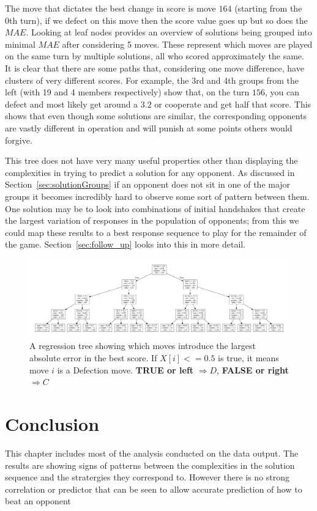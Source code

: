 The move that dictates the best change in score is move $164$ (starting from the 0th turn), if we defect on this move then the score value goes up but so does the $MAE$.
Looking at leaf nodes provides an overview of solutions being grouped into minimal $MAE$ after considering 5 moves.
These represent which moves are played on the same turn by multiple solutions, all who scored approximately the same.
It is clear that there are some paths that, considering one move difference, have clusters of very different scores. 
For example, the 3rd and 4th groups from the left (with 19 and 4 members respectively) show that, on the turn $156$, you can defect and most likely get around a $3.2$ or cooperate and get half that score.
This shows that even though some solutions are similar, the corresponding opponents are vastly different in operation and will punish at some points others would forgive.

This tree does not have very many useful properties other than displaying the complexities in trying to predict a solution for any opponent.
As discussed in Section~\ref{sec:solutionGroups} if an opponent does not sit in one of the major groups it becomes incredibly hard to observe some sort of pattern between them.
One solution may be to look into combinations of initial handshakes that create the largest variation of responses in the population of opponents; from this we could map these results to a best response sequence to play for the remainder of the game.
Section~\ref{sec:follow_up} looks into this in more detail.

\begin{figure}
    \includegraphics[width=1.0\textwidth, center]{./img/descriptive/reg_tree.pdf}
    \centering
    \caption{A regression tree showing which moves introduce the largest absolute error in the best score. If $X[i]<=0.5$ is true, it means move $i$ is a Defection move.
    \textbf{TRUE or left} $\Rightarrow D$, \textbf{FALSE or right} $\Rightarrow C$}
    \label{fig:reg_tree}
\end{figure}


\section{Conclusion}
This chapter includes most of the analysis conducted on the data output.
The results are showing signs of patterns between the complexities in the solution sequence and the stratergies they correspond to.
However there is no strong correlation or predictor that can be seen to allow accurate prediction of how to beat an opponent

